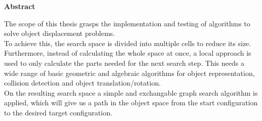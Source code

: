 




\pagestyle{headings}


\centerline{\bf Abstract}



%
\vskip 2cm
%


The scope of this thesis grasps the implementation and testing of algorithms to solve object displacement problems.\\
To achieve this, the search space is divided into multiple cells to reduce its size. Furthermore, instead of calculating the whole space at once, a local approach is used to only calculate the parts needed for the next search step. This needs a wide range of basic geometric and algebraic algorithms for object representation, collision detection and object translation/rotation.\\
On the resulting search space a simple and exchangable graph search algorithm is applied, which will give us a path in the object space from the
start configuration to the desired target configuration.

%
%
%
%
%
